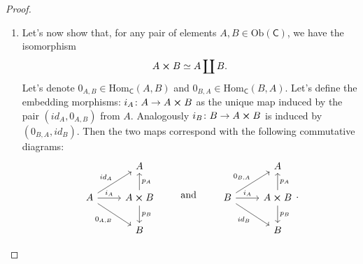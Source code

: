 \documentclass[../Main]{subfiles}
\begin{document}
\begin{proof}
\begin{enumerate}
		\item Let's now show that, 
			for any pair of elements $A, B \in \mathrm{Ob} \left(\mathsf{C}\right)$,
			we have the isomorphism
			\begin{equation}
			A \cross B \simeq A \coprod B
			.\end{equation} 
			Let's denote $0_{A,B} \in \mathrm{Hom}_{\mathsf{C}} \left( A, B \right)$
			and $0_{B,A} \in \mathrm{Hom}_{\mathsf{C}} \left( B, A \right)$.
			Let's define the embedding morphisms:
			$i_A\colon A \to A \cross B$ as the unique map
			induced by the pair $\left(id_A, 0_{A,B}\right)$ from $A$.
			Analogously $i_B\colon B \to A \cross B$
			is induced by $\left( 0_{B, A}, id_B \right)$.
			Then the two maps correspond with the following commutative diagrams:
			\begin{equation}
			\begin{tikzcd}
				&
				A\\
				A \arrow[ru, "id_A", rightarrow] \arrow[r, "i_A", rightarrow] 
				\arrow[rd, "0_{A,B}"', rightarrow] &
				A \cross B \arrow[u, "p_A"', rightarrow] \arrow[d, "p_B", rightarrow] \\
				&
				B
			\end{tikzcd}
			\qquad \text{ and } \qquad
			\begin{tikzcd}
				&
				A\\
				B \arrow[ru, "0_{B,A}", rightarrow] \arrow[r, "i_A", rightarrow] 
				\arrow[rd, "id_B"', rightarrow] &
				A \cross B \arrow[u, "p_A"', rightarrow] \arrow[d, "p_B", rightarrow] \\
				&
				B
			\end{tikzcd}
			.\end{equation} 


\end{enumerate}
\end{proof}
\end{document}
